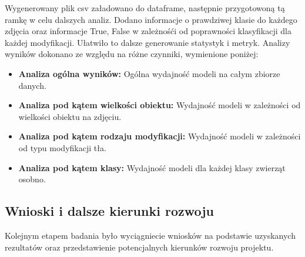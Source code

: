 Wygenerowany plik csv załadowano do dataframe, następnie przygotowoną tą ramkę w celu dalszych analiz. Dodano informacje o prawdziwej klasie do każdego zdjęcia oraz informacje True, False w zależnośći od poprawności klasyfikacji dla każdej 
modyfikacji. Ułatwiło to dalsze generowanie statystyk i metryk. Analizy wyników dokonano ze względu na różne czynniki, wymienione poniżej:
\begin{itemize}
    \item \textbf{Analiza ogólna wyników:} Ogólna wydajność modeli na całym zbiorze danych.
    \item \textbf{Analiza pod kątem wielkości obiektu:} Wydajność modeli w zależności od wielkości obiektu na zdjęciu.
    \item \textbf{Analiza pod kątem rodzaju modyfikacji:} Wydajność modeli w zależności od typu modyfikacji tła.
    \item \textbf{Analiza pod kątem klasy:} Wydajność modeli dla każdej klasy zwierząt osobno.
\end{itemize}

\subsection*{Wnioski i dalsze kierunki rozwoju}

Kolejnym etapem badania było wyciągniecie wniosków na podstawie uzyskanych rezultatów oraz przedstawienie potencjalnych kierunków rozwoju projektu.
